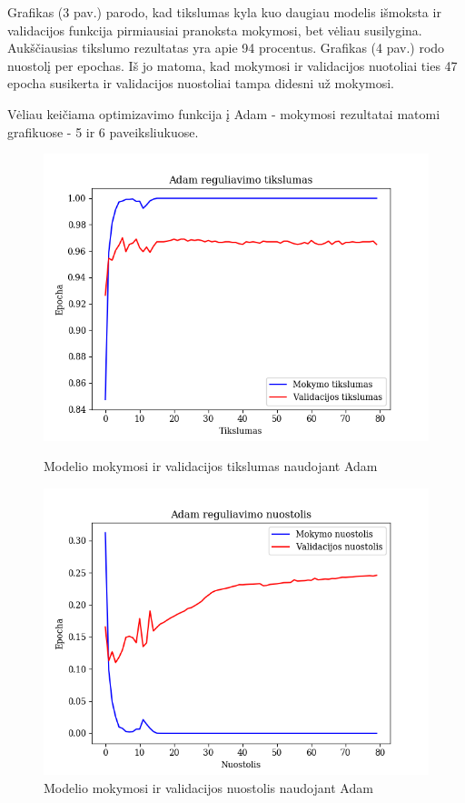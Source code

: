 \documentclass{VUMIFPSkursinis}
\begin{document}
Grafikas (3 pav.) parodo, kad tikslumas kyla kuo daugiau modelis išmoksta ir validacijos funkcija pirmiausiai pranoksta mokymosi, bet vėliau susilygina. Aukščiausias tikslumo rezultatas yra apie 94 procentus.
Grafikas (4 pav.) rodo nuostolį per epochas. Iš jo matoma, kad mokymosi ir validacijos nuotoliai ties 47 epocha susikerta ir validacijos nuostoliai tampa didesni už mokymosi.

Vėliau keičiama optimizavimo funkcija į Adam - mokymosi rezultatai matomi grafikuose - 5 ir 6 paveiksliukuose.

\begin{figure}[!htbp]
  \centering
  \begin{minipage}[b]{0.49\textwidth}
    \includegraphics[width=\textwidth]{img/FT/Adam_acc.png}
    \caption{Modelio mokymosi ir validacijos tikslumas naudojant Adam}
  \end{minipage}
  \begin{minipage}[b]{0.49\textwidth}
    \includegraphics[width=\textwidth]{img/FT/Adam_loss.png}
    \caption{Modelio mokymosi ir validacijos nuostolis naudojant Adam}
  \end{minipage}
\end{figure}
\end{document}
